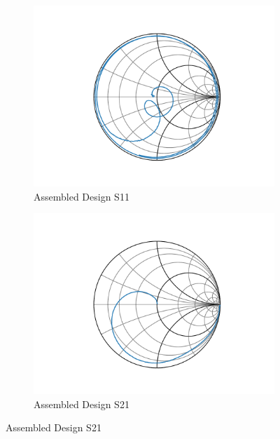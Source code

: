 \documentclass[letterpaper,12pt]{article}
\begin{document}
\begin{figure}[H]
    \begin{subfigure}[t]{.49\textwidth}
      \centering
      \includegraphics[width=\linewidth]{figures/8.s11.assembled}
      \caption{Assembled Design S11}
    \end{subfigure}
    \hfill
    \begin{subfigure}[t]{.49\textwidth}
      \centering
      \includegraphics[width=\linewidth]{figures/8.s21.assembled}
      \caption{Assembled Design S21}
    \end{subfigure}
\end{figure}

\newpage
\end{document}
